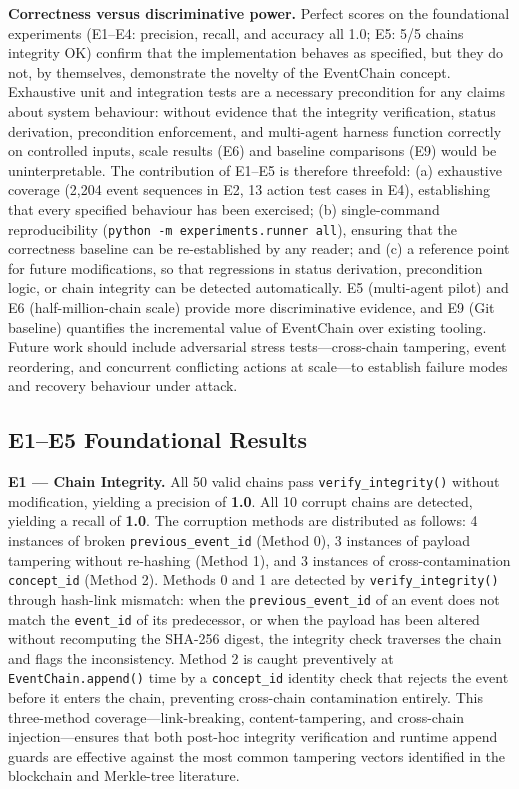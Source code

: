\textbf{Correctness versus discriminative power.} Perfect scores on the foundational experiments (E1--E4: precision, recall, and accuracy all 1.0; E5: 5/5 chains integrity OK) confirm that the implementation behaves as specified, but they do not, by themselves, demonstrate the novelty of the EventChain concept. Exhaustive unit and integration tests are a necessary precondition for any claims about system behaviour: without evidence that the integrity verification, status derivation, precondition enforcement, and multi-agent harness function correctly on controlled inputs, scale results (E6) and baseline comparisons (E9) would be uninterpretable. The contribution of E1--E5 is therefore threefold: (a) exhaustive coverage (2,204 event sequences in E2, 13 action test cases in E4), establishing that every specified behaviour has been exercised; (b) single-command reproducibility (\texttt{python\ -m\ experiments.runner\ all}), ensuring that the correctness baseline can be re-established by any reader; and (c) a reference point for future modifications, so that regressions in status derivation, precondition logic, or chain integrity can be detected automatically. E5 (multi-agent pilot) and E6 (half-million-chain scale) provide more discriminative evidence, and E9 (Git baseline) quantifies the incremental value of EventChain over existing tooling. Future work should include adversarial stress tests---cross-chain tampering, event reordering, and concurrent conflicting actions at scale---to establish failure modes and recovery behaviour under attack.

\subsection{E1--E5 Foundational Results}\label{e1e5-foundational-results}

\textbf{E1 --- Chain Integrity.} All 50 valid chains pass \texttt{verify\_integrity()} without modification, yielding a precision of \textbf{1.0}. All 10 corrupt chains are detected, yielding a recall of \textbf{1.0}. The corruption methods are distributed as follows: 4 instances of broken \texttt{previous\_event\_id} (Method 0), 3 instances of payload tampering without re-hashing (Method 1), and 3 instances of cross-contamination \texttt{concept\_id} (Method 2). Methods 0 and 1 are detected by \texttt{verify\_integrity()} through hash-link mismatch: when the \texttt{previous\_event\_id} of an event does not match the \texttt{event\_id} of its predecessor, or when the payload has been altered without recomputing the SHA-256 digest, the integrity check traverses the chain and flags the inconsistency. Method 2 is caught preventively at \texttt{EventChain.append()} time by a \texttt{concept\_id} identity check that rejects the event before it enters the chain, preventing cross-chain contamination entirely. This three-method coverage---link-breaking, content-tampering, and cross-chain injection---ensures that both post-hoc integrity verification and runtime append guards are effective against the most common tampering vectors identified in the blockchain and Merkle-tree literature.


